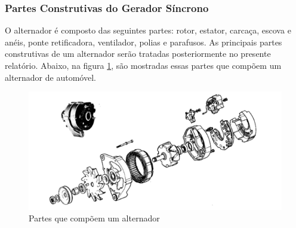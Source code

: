 \subsubsection{Partes Construtivas do Gerador Síncrono}
\label{construtivas-gerador-sincrono}

O alternador é composto das seguintes partes: rotor, estator, carcaça, escova e anéis, ponte retificadora, ventilador, polias e parafusos. As principais partes construtivas de um alternador serão tratadas posteriormente no presente relatório.
Abaixo, na figura \ref{partes-alternador}, são mostradas essas partes que compõem um alternador de automóvel.


\begin{figure}[h]
	\centering
	\includegraphics[scale= 0.8]		{figuras/partes_alternador.png}
	\caption{Partes que compõem um alternador}
	\label{partes-alternador}
\end{figure}

